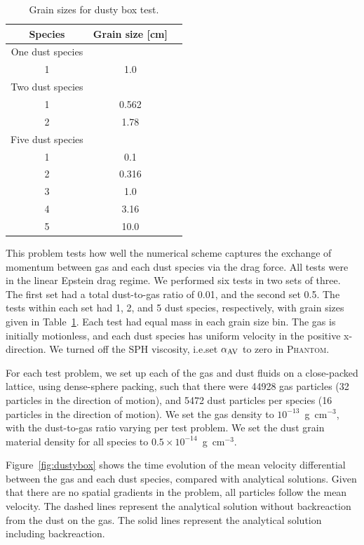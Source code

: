 \documentclass[fleqn,usenatbib]{mnras}
\begin{document}
\begin{table}
   \centering
   \begin{tabular}{ccc}
      \hline
      \hline
      Species & Grain size [cm] \\
      \hline
      \hline
      One dust species \\
      1 & 1.0 \\
      \hline
      Two dust species \\
      1 & 0.562 \\
      2 & 1.78 \\
      \hline
      Five dust species \\
      1 & 0.1 \\
      2 & 0.316 \\
      3 & 1.0 \\
      4 & 3.16 \\
      5 & 10.0 \\
      \hline
      \hline
   \end{tabular}
   \caption{Grain sizes for dusty box test.}%
   \label{tab:box}
\end{table}

This problem tests how well the numerical scheme captures the exchange of
momentum between gas and each dust species via the drag force. All tests were in
the linear Epstein drag regime. We performed six tests in two sets of three. The
first set had a total dust-to-gas ratio of 0.01, and the second set 0.5. The
tests within each set had 1, 2, and 5 dust species, respectively, with grain
sizes given in Table~\ref{tab:box}. Each test had equal mass in each grain size
bin. The gas is initially motionless, and each dust species has uniform velocity
in the positive x-direction. We turned off the SPH viscosity, i.e.\@ set
\(\alpha_{\rm AV}\) to zero in \textsc{Phantom}.

For each test problem, we set up each of the gas and dust fluids on a
close-packed lattice, using dense-sphere packing, such that there were 44928 gas
particles (32 particles in the direction of motion), and 5472 dust particles per
species (16 particles in the direction of motion). We set the gas density to
\(10^{-13}\)~g~cm\({}^{-3}\), with the dust-to-gas ratio varying per test
problem. We set the dust grain material density for all species to \(0.5 \times
10^{-14}\)~g~cm\({}^{-3}\).

Figure~\ref{fig:dustybox} shows the time evolution of the mean velocity
differential between the gas and each dust species, compared with analytical
solutions. Given that there are no spatial gradients in the problem, all
particles follow the mean velocity. The dashed lines represent the analytical
solution without backreaction from the dust on the gas. The solid lines
represent the analytical solution including backreaction.
\end{document}
